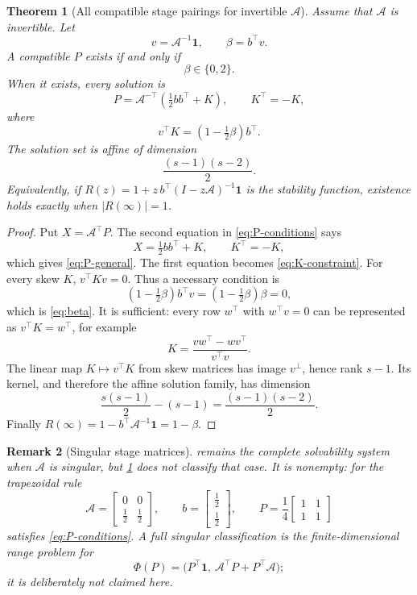\documentclass[11pt,a4paper]{article}
\newtheorem{theorem}{Theorem}[section]
\newtheorem{remark}[theorem]{Remark}
\newcommand{\one}{\bm 1}
\begin{document}
\begin{theorem}[All compatible stage pairings for invertible \(\mathcal A\)]
\label{thm:P-family}
Assume that \(\mathcal A\) is invertible.  Let
\[
 v=\mathcal A^{-1}\one,\qquad \beta=b^\top v.
\]
A compatible \(P\) exists if and only if
\begin{equation}\label{eq:beta}
 \beta\in\{0,2\}.
\end{equation}
When it exists, every solution is
\begin{equation}\label{eq:P-general}
 P=\mathcal A^{-\top}\left(\tfrac12bb^\top+K\right),
 \qquad K^\top=-K,
\end{equation}
where
\begin{equation}\label{eq:K-constraint}
 v^\top K=(1-\tfrac12\beta)b^\top.
\end{equation}
The solution set is affine of dimension
\begin{equation}\label{eq:P-dimension}
 \frac{(s-1)(s-2)}2.
\end{equation}
Equivalently, if \(R(z)=1+z\,b^\top(I-z\mathcal A)^{-1}\one\) is the
stability function, existence holds exactly when
\(|R(\infty)|=1\).
\end{theorem}

\begin{proof}
Put \(X=\mathcal A^\top P\). The second equation in
\cref{eq:P-conditions} says
\[
 X=\tfrac12bb^\top+K,\qquad K^\top=-K,
\]
which gives \cref{eq:P-general}. The first equation becomes
\cref{eq:K-constraint}. For every skew \(K\),
\(v^\top Kv=0\). Thus a necessary condition is
\[
 (1-\tfrac12\beta)b^\top v
 =(1-\tfrac12\beta)\beta=0,
\]
which is \cref{eq:beta}. It is sufficient: every row \(w^\top\) with
\(w^\top v=0\) can be represented as \(v^\top K=w^\top\), for example
\[
 K=\frac{vw^\top-wv^\top}{v^\top v}.
\]
The linear map \(K\mapsto v^\top K\) from skew matrices has image
\(v^\perp\), hence rank \(s-1\). Its kernel, and therefore the affine
solution family, has dimension
\[
 \frac{s(s-1)}2-(s-1)=\frac{(s-1)(s-2)}2.
\]
Finally \(R(\infty)=1-b^\top\mathcal A^{-1}\one=1-\beta\).
\end{proof}

\begin{remark}[Singular stage matrices]
\label{rem:singular-stage}
 remains the complete solvability system when
\(\mathcal A\) is singular, but \cref{thm:P-family} does not classify that
case.  It is nonempty: for the trapezoidal rule
\[
 \mathcal A=
 \begin{bmatrix}0&0\\[1mm]\tfrac12&\tfrac12\end{bmatrix},
 \qquad b=\begin{bmatrix}\tfrac12\\[1mm]\tfrac12\end{bmatrix},
 \qquad
 P=\frac14\begin{bmatrix}1&1\\1&1\end{bmatrix}
\]
satisfies \cref{eq:P-conditions}.  A full singular classification is the
finite-dimensional range problem for
\[
 \Phi(P)=\bigl(P^\top\one,\,
 \mathcal A^\top P+P^\top\mathcal A\bigr);
\]
it is deliberately not claimed here.
\end{remark}
\end{document}
